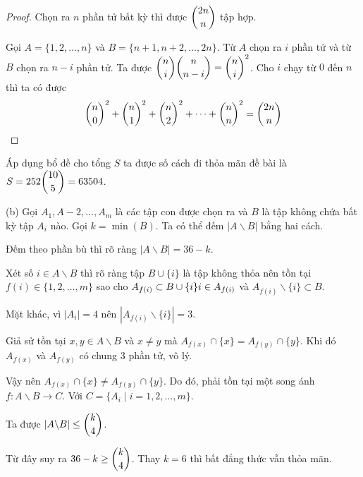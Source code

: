 \documentclass[11pt]{scrartcl}
\begin{document}
\begin{itemize}[label=, leftmargin=0em, itemsep=0.5em]
\begin{sol}
\begin{proof}
             Chọn ra $n$ phần tử bất kỳ thì được $\displaystyle\binom{2n}{n}$ tập hợp.
            
             Gọi $A = \{1,2,\dots,n\}$ và $B = \{n + 1, n + 2,\dots, 2n\}$. Từ $A$ chọn ra $i$ phần tử và từ $B$ chọn ra $n - i$ phần tử. Ta được $\displaystyle\binom{n}{i}\displaystyle\binom{n}{n - i}= \displaystyle\binom{n}{i}^2$. Cho $i$ chạy từ $0$ đến $n$ thì ta có được 
            \[
                \displaystyle\binom{n}{0}^2 + \displaystyle\binom{n}{1}^2 + \displaystyle\binom{n}{2}^2 + \dots + \displaystyle\binom{n}{n}^2 = \displaystyle\binom{2n}{n}
            \]
        \end{proof}
        Áp dụng bổ đề cho tổng $S$ ta được số cách đi thỏa mãn đề bài là 
        \(
            S = 252 \displaystyle\binom{10}{5} = 63504
        \).
        
        (b) Gọi $A_1,A-2,\dots,A_m$ là các tập con được chọn ra và $B$  là tập không chứa bất kỳ tập $A_i$ nào. Gọi $k = \min(B)$. Ta có thể đếm $|A \backslash B|$ bằng hai cách.

         Đếm theo phần bù thì rõ ràng $|A \backslash B| = 36 - k$.

        Xét số $i\in A \backslash B$ thì rõ ràng tập $B \cup \{i\}$ là tập không thỏa nên tồn tại $f(i) \in \{1,2,\dots,m\}$ sao cho $A_{f(i)} \subset B \cup \{i\} \ra i\in A_{f(i)}$ và $A_{f(i)} \backslash \{i\} \subset B$.

        Mặt khác, vì $|A_{i}| = 4$ nên $|A_{f(i)} \backslash \{i\}| = 3$.
        
        Giả sử tồn tại $x, y \in A\backslash B$ và $x \neq y$ mà $A_{f(x)} \cap \{x\}= A_{f(y)} \cap \{y\}$. Khi đó $A_{f(x)}$ và $A_{f(y)}$ có chung $3$ phần tử, vô lý. 
        
        Vậy nên $A_{f(x)} \cap \{x\} \neq A_{f(y)} \cap \{y\}$. Do đó, phải tồn tại một song ánh $f: A\backslash B \to C$. Với $C = \{A_i \mid i =1,2,\dots,m\}$.

        Ta được $|A \backslash B| \leq \displaystyle\binom{k}{4}$. 

        Từ đây suy ra $36 - k \geq \displaystyle\binom{k}{4}$. Thay $k = 6$ thì bất đẳng thức vẫn thỏa mãn. 


\end{sol}
\end{itemize}
\end{document}
